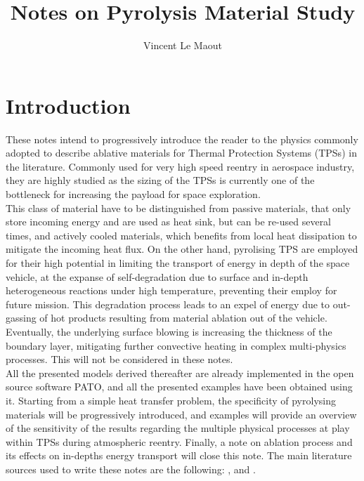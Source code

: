 \documentclass[english,10pt,a4paper,oneside,twocolumn,titlepage]{report}
\title{Notes on Pyrolysis Material Study}
\author{Vincent Le Maout}
\begin{document}
	\maketitle
	
	\section{Introduction}
	\label{section0}
	These notes intend to progressively introduce the
	reader to the physics commonly adopted to describe 
	ablative materials for Thermal Protection Systems 
	(TPSs) in the literature. Commonly used for 
	very high speed reentry in aerospace industry, they
	are highly studied as the sizing of the TPSs is 
	currently one of the bottleneck for increasing the 
	payload for space exploration. \\ 
	This class of material have to be distinguished from 
	passive materials, that only store incoming energy and
	are used as heat sink, but can be re-used several times,
	 and actively cooled materials, which benefits from local
	 heat dissipation to mitigate the incoming heat flux. On 
	 the other hand, pyrolising TPS are employed for their
	 high potential in limiting the transport of energy in depth
	 of the space vehicle, at the expanse of self-degradation 
	 due to surface and in-depth heterogeneous reactions
	  under high temperature, preventing their 
	  employ for future mission.
	 This degradation process leads to an expel of energy 
	 due to out-gassing of hot products resulting from
	  material	 ablation out of the vehicle. Eventually, the 
	 underlying surface blowing is increasing the 
	 thickness of the boundary layer, mitigating further
	 convective heating in complex multi-physics processes.
	 This will not be considered in these notes.	 \\
	 All the presented models derived thereafter
	 are already implemented in the open source 
	software PATO, and all the presented examples 
	have been obtained using it. 
	Starting from a simple heat transfer problem, the 
	specificity of pyrolysing materials will be progressively 
	introduced, and examples will provide an overview 
	of the sensitivity of the results regarding the 
	multiple physical processes at play within TPSs during
	atmospheric reentry. Finally, a note on ablation process
	and its effects on in-depths energy transport will close 
	this note. The main literature sources used to write these
	notes are the following: \cite{Lachaud2017}, 
	\cite{Marschall2015} and \cite{Johnston2014}.
\end{document}
